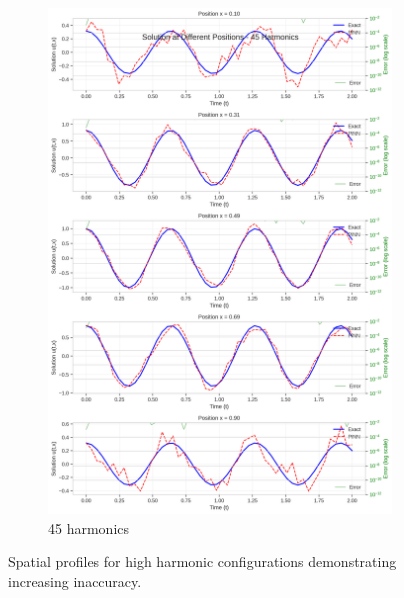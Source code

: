 \begin{figure}[H]
\begin{subfigure}[b]{0.32\textwidth}
        \includegraphics[width=\textwidth]{figures/space_slices_45h.png}
        \caption{45 harmonics}
    \end{subfigure}
    \caption{Spatial profiles for high harmonic configurations demonstrating increasing inaccuracy.}
    \label{fig:space_slices_high}
\end{figure}

